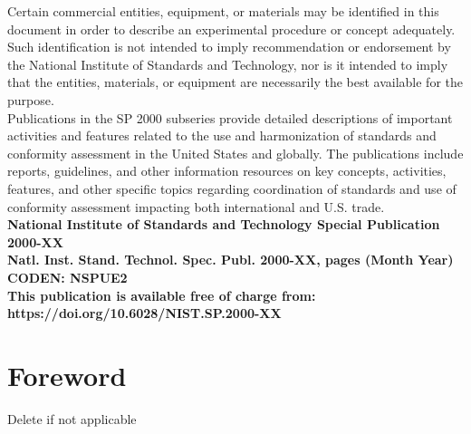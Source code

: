 \documentclass[12pt]{article}
\newcommand{\pubnumber}{2000-XX}
\newcommand{\DOI}{https://doi.org/10.6028/NIST.SP.2000-XX}
\newcommand{\monthyear}{Month Year}
\begin{document}
\begin{titlepage}
\begin{flushright}
\footnotesize  Certain commercial entities, equipment, or materials may be identified in this document in order to describe an experimental procedure or concept adequately. Such identification is not intended to imply recommendation or endorsement by the National Institute of Standards and Technology, nor is it intended to imply that the entities, materials, or equipment are necessarily the best available for the purpose.\\ 
\vspace{12pt}
\vspace{12pt}
Publications in the SP 2000 subseries provide detailed descriptions of important activities and features related to the use and harmonization of standards and conformity assessment in the United States and globally. The publications include reports, guidelines, and other information resources on key concepts, activities, features, and other specific topics regarding coordination of standards and use of conformity assessment impacting both international and U.S. trade.\\
\vfill
\normalsize \textbf{National Institute of Standards and Technology Special Publication \pubnumber\\ 
Natl. Inst. Stand. Technol. Spec. Publ. \pubnumber, \pageref{LastPage} pages (\monthyear)} \\
\textbf{CODEN: NSPUE2}\\
\vspace{12pt}
\textbf{This publication is available free of charge from: \DOI}
\vfill
\end{flushright}
\end{titlepage}
\section*{Foreword}
\normalsize Delete if not applicable\\
\end{document}
